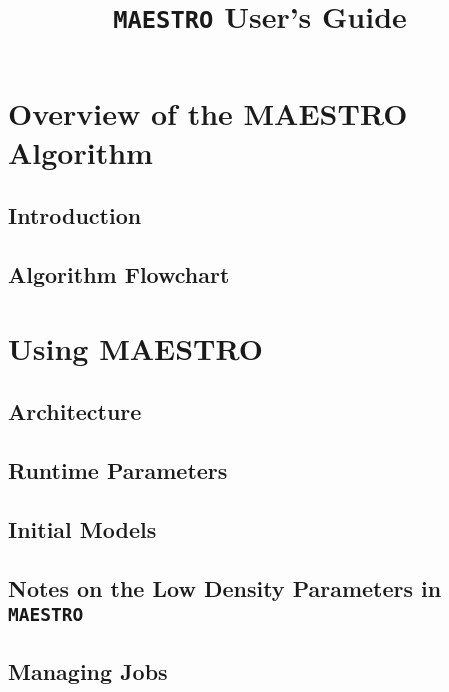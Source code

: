 \documentclass[11pt]{book}
\title{\Huge \bf {\tt MAESTRO} User's Guide}
\begin{document}
\maketitle
\tableofcontents
\cleardoublepage

\part{Overview of the MAESTRO Algorithm}

\chapter{Introduction}


\chapter{Algorithm Flowchart}


\part{Using MAESTRO}

\chapter{Architecture}


\chapter{Runtime Parameters}



\chapter{Initial Models}


\chapter{Notes on the Low Density Parameters in {\tt MAESTRO}}


\chapter{Managing Jobs}

\end{document}
